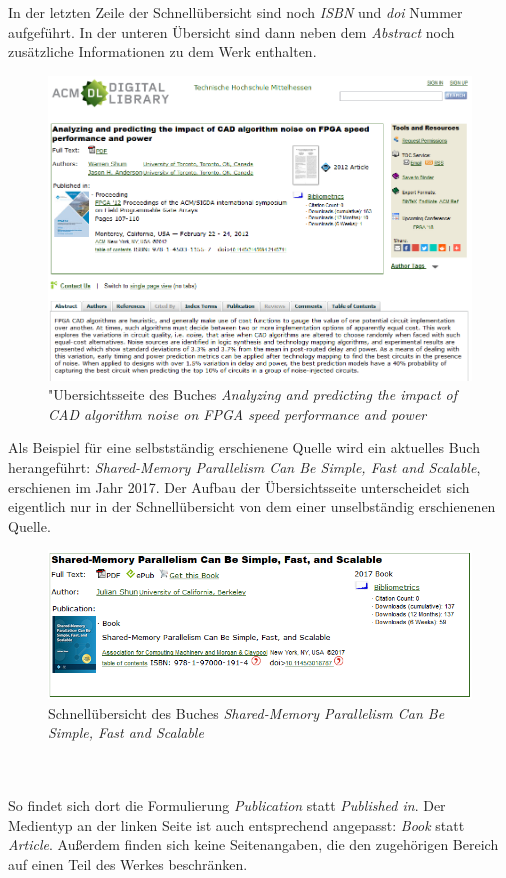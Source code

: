 \documentclass[
	ngerman,
	parskip=half,
	headsepline,
	fontsize=12pt,
	DIV=13,
	listof=leveldown,
	]{scrreprt}
\begin{document}
In der letzten Zeile der Schnellübersicht sind noch \textit{ISBN} und \textit{doi} Nummer aufgeführt.
In der unteren Übersicht sind dann neben dem \textit{Abstract} noch zusätzliche Informationen zu dem Werk enthalten.
\begin{figure}[ht]
\centering
\includegraphics[width=\textwidth]{img/Details.PNG}
\caption{"Ubersichtsseite des Buches \textit{Analyzing and predicting the impact of CAD algorithm noise on FPGA speed performance and power} {\cite{image:details}}}
\end{figure}
\clearpage
Als Beispiel für eine selbstständig erschienene Quelle wird ein aktuelles Buch herangeführt: \textit{Shared-Memory Parallelism Can Be Simple, Fast and Scalable}, erschienen im Jahr 2017. Der Aufbau der Übersichtsseite unterscheidet sich eigentlich nur in der Schnellübersicht von dem einer unselbständig erschienenen Quelle.
\ \\
\begin{figure}[ht]
\centering
\includegraphics[width=\textwidth]{img/seq.PNG}
\caption{Schnellübersicht des Buches \textit{Shared-Memory Parallelism Can Be Simple, Fast and Scalable} {\cite{image:seq}}}
\end{figure}
\ \\
\ \\
So findet sich dort die Formulierung \textit{Publication} statt \textit{Published in}. Der Medientyp an der linken Seite ist auch entsprechend angepasst: \textit{Book} statt \textit{Article}. Außerdem finden sich keine Seitenangaben, die den zugehörigen Bereich auf einen Teil des Werkes beschränken.
\end{document}
